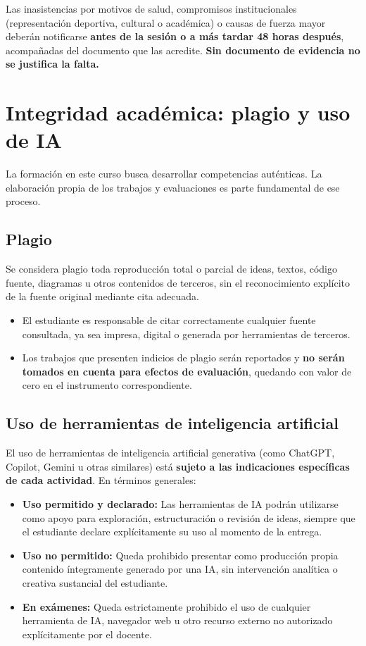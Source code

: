 \documentclass[12pt]{article}
\begin{document}
	Las inasistencias por motivos de salud, compromisos institucionales (representación deportiva, cultural o académica) o causas de fuerza mayor deberán notificarse \textbf{antes de la sesión o a más tardar 48 horas después}, acompañadas del documento que las acredite. \textbf{Sin documento de evidencia no se justifica la falta.}
	
	\section*{Integridad académica: plagio y uso de IA}
	
	La formación en este curso busca desarrollar competencias auténticas. La elaboración propia de los trabajos y evaluaciones es parte fundamental de ese proceso.
	
	\subsection*{Plagio}
	
	Se considera plagio toda reproducción total o parcial de ideas, textos, código fuente, diagramas u otros contenidos de terceros, sin el reconocimiento explícito de la fuente original mediante cita adecuada.
	
	\begin{itemize}
		\item El estudiante es responsable de citar correctamente cualquier fuente consultada, ya sea impresa, digital o generada por herramientas de terceros.
		\item Los trabajos que presenten indicios de plagio serán reportados y \textbf{no serán tomados en cuenta para efectos de evaluación}, quedando con valor de cero en el instrumento correspondiente.
	\end{itemize}
	
	\subsection*{Uso de herramientas de inteligencia artificial}
	
	El uso de herramientas de inteligencia artificial generativa (como ChatGPT, Copilot, Gemini u otras similares) está \textbf{sujeto a las indicaciones específicas de cada actividad}. En términos generales:
	
	\begin{itemize}
		\item \textbf{Uso permitido y declarado:} Las herramientas de IA podrán utilizarse como apoyo para exploración, estructuración o revisión de ideas, siempre que el estudiante declare explícitamente su uso al momento de la entrega.
		\item \textbf{Uso no permitido:} Queda prohibido presentar como producción propia contenido íntegramente generado por una IA, sin intervención analítica o creativa sustancial del estudiante.
		\item \textbf{En exámenes:} Queda estrictamente prohibido el uso de cualquier herramienta de IA, navegador web u otro recurso externo no autorizado explícitamente por el docente.
	\end{itemize}
	
\end{document}
